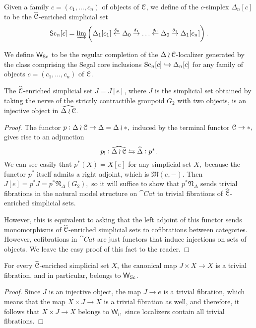 \begin{defn}
Given a family \(c=(c_1,\dots,c_n)\) of objects of \(\mathcal{C}\), we define  of the \(c\)-simplex \(\Delta_n[c]\) to be the \(\widehat{\mathcal{C}}\)-enriched simplicial set 
\[{\operatorname{Sc}}_n[c]=\varinjlim\left(\Delta_1[c_1] \overset{\delta_0}{\leftarrow} \Delta_0 \overset{\delta_1}{\to} \dots \overset{\delta_0}{\leftarrow} \Delta_0 \overset{\delta_1}{\to} \Delta_1[c_n]\right ).\]
\end{defn}
\begin{defn} We define \(\mathsf{W}_{{\operatorname{Sc}}}\) to be the regular completion of the \(\Delta\wr\mathcal{C}\)-localizer generated by the class comprising the Segal core inclusions \({\operatorname{Sc}}_n[c]\hookrightarrow \Delta_n[c]\) for any family of objects \(c=(c_1,\dots,c_n)\) of \(\mathcal{C}\). 
\end{defn}
\begin{lemma} The \(\widehat{\mathcal{C}}\)-enriched simplicial set \(J=J[e]\), where \(J\) is the simplicial set obtained by taking the nerve of the strictly contractible groupoid \(G_2\) with two objects, is an injective object in \(\widehat{\Delta\wr\mathcal{C}}\). 
\end{lemma}
\begin{proof}  The functor \(p:\Delta\wr \mathcal{C} \to \Delta=\Delta\wr \ast,\) induced by the terminal functor \(\mathcal{C}\to \ast,\) gives rise to an adjunction \[p_!:\widehat{\Delta\wr\mathcal{C}}\leftrightarrows\widehat{\Delta}:p^*.\]  We can see easily that \(p^*(X)=X[e]\) for any simplicial set \(X,\) because the functor \(p^*\) itself admits a right adjoint, which is \(\mathfrak{M}(e,-)\).  Then \(J[e]=p^*J=p^*\mathfrak{N}_\Delta(G_2),\) so it will suffice to show that \(p^*\mathfrak{N}_\Delta\) sends trivial fibrations in the natural model structure on \(\cat{Cat}\) to trivial fibrations of \(\widehat{\mathcal{C}}\)-enriched simplicial sets.

However, this is equivalent to asking that the left adjoint of this functor sends monomorphisms of \(\widehat{\mathcal{C}}\)-enriched simplicial sets to cofibrations between categories.  However, cofibrations in \(\cat{Cat}\) are just functors that induce injections on sets of objects.  We leave the easy proof of this fact to the reader.  
\end{proof}
\begin{cor}For every \(\widehat{\mathcal{C}}\)-enriched simplicial set \(X\), the canonical map \(J\times X\to X\) is a trivial fibration, and in particular, belongs to \(\mathsf{W}_{{\operatorname{Sc}}}\).
\end{cor}
\begin{proof} Since \(J\) is an injective object, the map \(J\to e\) is a trivial fibration, which means that the map \(X\times J\to X\) is a trivial fibration as well, and therefore, it follows that \(X\times J\to X\) belongs to \(\mathsf{W}_\wr,\) since localizers contain all trivial fibrations.  
\end{proof}

